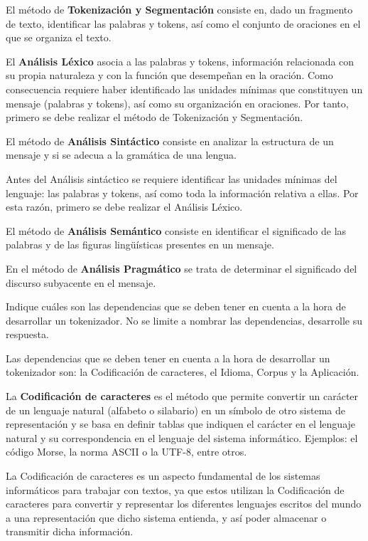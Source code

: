 \documentclass[11pt]{exam}
\begin{document}
\begin{questions}
El método de {\bf Tokenización y Segmentación} consiste en, dado un fragmento de texto, identificar las palabras y tokens, así como el conjunto de oraciones en el que se organiza el texto.

El {\bf Análisis Léxico} asocia a las palabras y tokens, información relacionada con su propia naturaleza y con la función que desempeñan en la oración. Como consecuencia requiere haber identificado las unidades mínimas que constituyen un mensaje (palabras y tokens), así como su organización en oraciones. Por tanto, primero se debe realizar el método de Tokenización y Segmentación.

El método de {\bf Análisis Sintáctico} consiste en analizar la estructura de un mensaje y si se adecua a la gramática de una lengua.

Antes del Análisis sintáctico se requiere identificar las unidades mínimas del lenguaje: las palabras y tokens, así como toda la información relativa a ellas. Por esta razón, primero se debe realizar el Análisis Léxico.

El método de {\bf Análisis Semántico} consiste en identificar el significado de las palabras y de las figuras lingüísticas presentes en un mensaje.

En el método de {\bf Análisis Pragmático} se trata de determinar el significado del discurso subyacente en el mensaje.

\question Indique cuáles son las dependencias que se deben tener en cuenta a la hora de desarrollar un tokenizador. No se limite a nombrar las dependencias, desarrolle su respuesta.

Las dependencias que se deben tener en cuenta a la hora de desarrollar un tokenizador son: la Codificación de caracteres, el Idioma, Corpus y la Aplicación.

La {\bf Codificación de caracteres} es el método que permite convertir un carácter de un lenguaje natural (alfabeto o silabario) en un símbolo de otro sistema de representación y se basa en definir tablas que indiquen el carácter en el lenguaje natural y su correspondencia en el lenguaje del sistema informático. Ejemplos: el código Morse, la norma ASCII o la UTF-8, entre otros. 

La Codificación de caracteres es un aspecto fundamental de los sistemas informáticos para trabajar con textos, ya que estos utilizan la Codificación de caracteres para convertir y representar los diferentes lenguajes escritos del mundo a una representación que dicho sistema entienda, y así poder almacenar o transmitir dicha información.


\end{questions}
\end{document}
